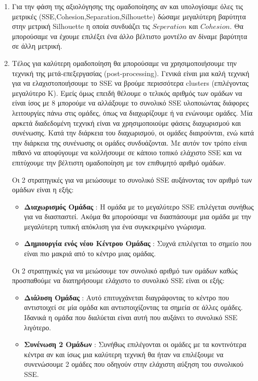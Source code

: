 \begin{enumerate}
    \item Για την φάση της αξιολόγησης της ομαδοποίησης αν και υπολογίσαμε όλες τις μετρικές (SSE,Cohesion,Separation,Silhouette) δώσαμε μεγαλύτερη βαρύτητα στην μετρική Silhouette η οποία συνδυάζει τις $Seperation$ και $Cohesion$. Θα μπορούσαμε να έχουμε επιλέξει ένα άλλο βέλτιστο μοντέλο αν δίναμε βαρύτητα σε άλλη μετρική.
    \item Τέλος για καλύτερη ομαδοποίηση θα μπορούσαμε να χρησιμοποιήσουμε την τεχνική της μετά-επεξεργασίας (post-processing). Γενικά είναι μια καλή τεχνική για να ελαχιστοποιήσουμε το SSE να βρούμε περισσότερα clusters (επιλέγοντας μεγαλύτερο Κ). Εμείς όμως επειδή θέλουμε ο τελικός αριθμός των ομάδων να είναι ίσος με 8 μπορούμε να αλλάξουμε το συνολικό SSE υλοποιώντας διάφορες λειτουργίες πάνω στις ομάδες, όπως να διαχωρίζουμε ή να ενώνουμε ομάδες. Μία αρκετά διαδεδομένη τεχνική είναι να χρησιμοποιούμε φάσεις διαχωρισμού και συνένωσης. Κατά την διάρκεια του διαχωρισμού, οι ομάδες διαιρούνται, ενώ κατά την διάρκεια της συνένωσης οι ομάδες συνδυάζονται. Με αυτόν τον τρόπο είναι πιθανό να αποφύγουμε να κολλήσουμε σε κάποιο τοπικό ελάχιστο SSE και να επιτύχουμε την βέλτιστη ομαδοποίηση με τον επιθυμητό αριθμό ομάδων.
    
     Οι 2 στρατηγικές για να μειώσουμε το συνολικό SSE αυξάνοντας τον αριθμό των ομάδων είναι η εξής:
    \begin{itemize}
        \item \textbf{Διαχωρισμός Ομάδας} : Η ομάδα με το μεγαλύτερο SSE επιλέγεται συνήθως για να διασπαστεί. Ακόμα θα μπορούσαμε να διασπάσουμε μια ομάδα με την μεγαλύτερη τυπική απόκλιση για ένα συγκεκριμένο γνώρισμα.
        \item \textbf{Δημιουργία ενός νέου Κέντρου Ομάδας} : Συχνά επιλέγεται το σημείο που είναι πιο μακριά από το κέντρο μιας ομάδας.
    \end{itemize} 
    
    Οι 2 στρατηγικές για να μειώσουμε τον συνολικό αριθμό των ομάδων καθώς προσπαθούμε να διατηρήσουμε ελάχιστο το συνολικό SSE είναι οι εξής:
    
        \begin{itemize}
            \item \textbf{Διάλυση Ομάδας} : Αυτό επιτυγχάνεται διαγράφοντας το κέντρο που αντιστοιχεί σε μία ομάδα και αντιστοιχίζοντας τα σημεία σε άλλες ομάδες. Ιδανικά η ομάδα που διαλύεται είναι αυτή που αυξάνει το συνολικό SSE λιγότερο.
            \item \textbf{Συνένωση 2 Ομάδων} : Συνήθως επιλέγονται οι ομάδες με τα κοντινότερα κέντρα αν και ίσως μια καλύτερη τεχνική θα ήταν να επιλέξουμε να συνενώσουμε 2 ομάδες που οδηγούν στην ελάχιστη αύξηση του συνολικού SSE.
        \end{itemize} 
        

\end{enumerate}
